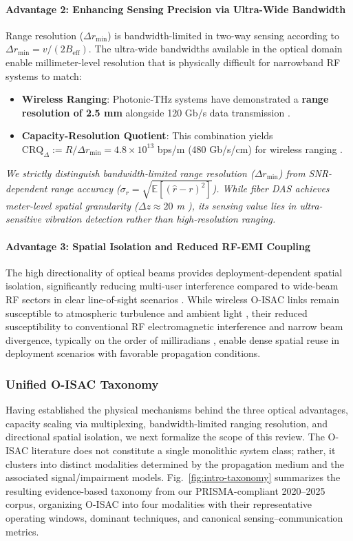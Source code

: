 \paragraph{Advantage 2: Enhancing Sensing Precision via Ultra-Wide Bandwidth}
Range resolution ($\Delta r_{\min}$) is bandwidth-limited in two-way sensing according to $\Delta r_{\min} = v/(2B_{\text{eff}})$. The ultra-wide bandwidths available in the optical domain enable millimeter-level resolution that is physically difficult for narrowband RF systems to match:
\begin{itemize}
\item \textbf{Wireless Ranging}: Photonic-THz systems have demonstrated a \textbf{range resolution of 2.5 mm} alongside 120 Gb/s data transmission \cite{O_ISAC_105}.
\item \textbf{Capacity-Resolution Quotient}: This combination yields $\mathrm{CRQ}_{\Delta} := R / \Delta r_{\min} = 4.8\times10^{13}$ bps/m (480 Gb/s/cm) for wireless ranging \cite{O_ISAC_105}.
\end{itemize}
\emph{We strictly distinguish bandwidth-limited range resolution ($\Delta r_{\min}$) from SNR-dependent range accuracy ($\sigma_r = \sqrt{\mathbb{E}[(\hat r-r)^2]}$). While fiber DAS achieves meter-level spatial granularity ($\Delta z \approx 20$ m \cite{O_ISAC_046}), its sensing value lies in ultra-sensitive vibration detection rather than high-resolution ranging.}

\paragraph{Advantage 3: Spatial Isolation and Reduced RF-EMI Coupling}
The high directionality of optical beams provides deployment-dependent spatial isolation, significantly reducing multi-user interference compared to wide-beam RF sectors in clear line-of-sight scenarios \cite{O_ISAC_021}. While wireless O-ISAC links remain susceptible to atmospheric turbulence and ambient light \cite{O_ISAC_003}, their reduced susceptibility to conventional RF electromagnetic interference and narrow beam divergence, typically on the order of milliradians \cite{O_ISAC_021}, enable dense spatial reuse in deployment scenarios with favorable propagation conditions.

\subsubsection{Unified O-ISAC Taxonomy}

Having established the physical mechanisms behind the three optical advantages, capacity scaling via multiplexing, bandwidth-limited ranging resolution, and directional spatial isolation, we next formalize the scope of this review. The O-ISAC literature does not constitute a single monolithic system class; rather, it clusters into distinct modalities determined by the propagation medium and the associated signal/impairment models. Fig.~\ref{fig:intro-taxonomy} summarizes the resulting evidence-based taxonomy from our PRISMA-compliant 2020--2025 corpus, organizing O-ISAC into four modalities with their representative operating windows, dominant techniques, and canonical sensing--communication metrics.

